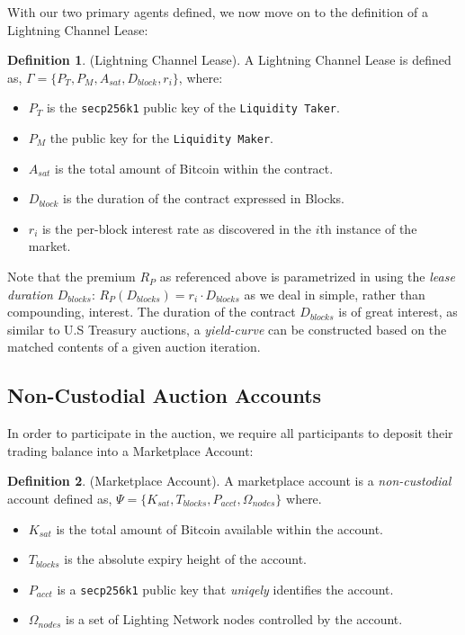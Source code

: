 \documentclass[10pt,a4paper]{article}
\theoremstyle{definition}
\newtheorem{definition}{Definition}[section]
\begin{document}
With our two primary agents defined, we now move on to the definition of a
Lightning Channel Lease:

\begin{definition}{(Lightning Channel Lease).}
    A Lightning Channel Lease is defined as, $\Gamma = \{P_{T}, P_{M}, A_{sat},
    D_{block}, r_{i} \}$, where:
\end{definition}

\begin{itemize}
    \item $P_{T}$ is the \texttt{secp256k1} public key of the \texttt{Liquidity Taker}. 
    \item $P_{M}$ the public key for the \texttt{Liquidity Maker}. 
    \item $A_{sat}$ is the total amount of Bitcoin within the contract.
    \item $D_{block}$ is the duration of the contract expressed in Blocks.
    \item $r_{i}$ is the per-block interest rate as discovered in the $i$th
    instance of the market.
\end{itemize}

Note that the premium $R_{P}$ as referenced above is parametrized in using the
\emph{lease duration} $D_{blocks}$: $R_{P}(D_{blocks}) = r_i \cdot D_{blocks}$ as
we deal in simple, rather than compounding, interest.  The duration of the
contract $D_{blocks}$ is of great interest, as similar to U.S Treasury
auctions, a \emph{yield-curve} can be constructed based on the matched
contents of a given auction iteration.


\subsection{Non-Custodial Auction Accounts}

In order to participate in the auction, we require all participants to deposit their
trading balance into a Marketplace Account:

\theoremstyle{definition}
\begin{definition}{(Marketplace Account).}
A marketplace account is a \emph{non-custodial} account defined as, $\Psi =
\{K_{sat}, T_{blocks}, P_{acct}, \Omega_{nodes} \}$ where.
\end{definition}

\begin{itemize}
    \item $K_{sat}$ is the total amount of Bitcoin available within the account.
    \item $T_{blocks}$ is the absolute expiry height of the account.
    \item $P_{acct}$ is a \texttt{secp256k1} public key  that \emph{uniqely} identifies the account.
    \item $\Omega_{nodes}$ is a set of Lighting Network nodes controlled by the account.
\end{itemize}
\end{document}
